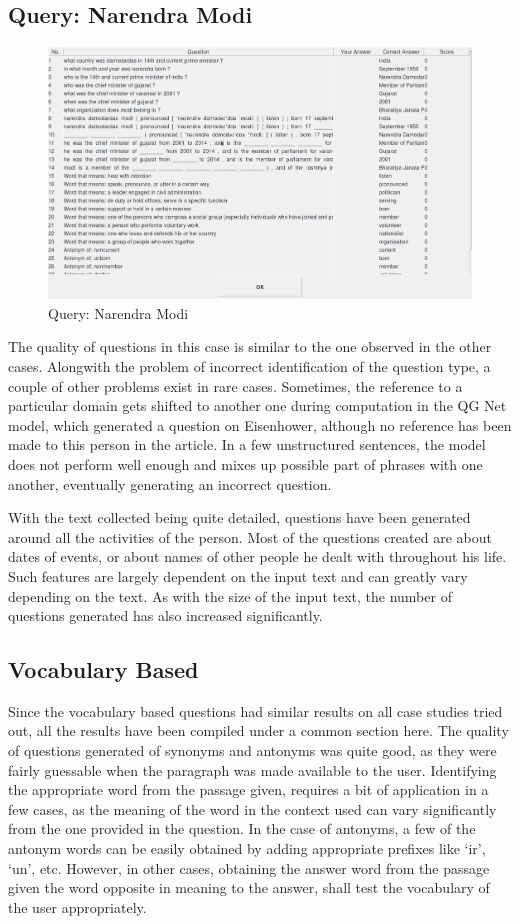 \subsection{Query: Narendra Modi}

\begin{figure}
	\caption{Query: Narendra Modi}
	\centering\includegraphics[width=12cm]{11.png}
\end{figure}

The quality of questions in this case is similar to the one observed in the
other cases. Alongwith the problem of incorrect identification of the question
type, a couple of other problems exist in rare cases.  Sometimes, the reference
to a particular domain gets shifted to another one during computation in the QG
Net model, which generated a question on Eisenhower, although no reference has
been made to this person in the article. In a few unstructured sentences, the
model does not perform well enough and mixes up possible part of phrases with
one another, eventually generating an incorrect question.

With the text collected being quite detailed, questions have been generated
around all the activities of the person. Most of the questions created are about
dates of events, or about names of other people he dealt with throughout his
life. Such features are largely dependent on the input text and can greatly vary
depending on the text. As with the size of the input text, the number of
questions generated has also increased significantly.

\subsection{Vocabulary Based}

Since the vocabulary based questions had similar results on all case studies
tried out, all the results have been compiled under a common section here. The
quality of questions generated of synonyms and antonyms was quite good, as they
were fairly guessable when the paragraph was made available to the user.
Identifying the appropriate word from the passage given, requires a bit of
application in a few cases, as the meaning of the word in the context used can
vary significantly from the one provided in the question. In the case of
antonyms, a few of the antonym words can be easily obtained by adding
appropriate prefixes like ‘ir’, ‘un’, etc. However, in other cases, obtaining
the answer word from the passage given the word opposite in meaning to the
answer, shall test the vocabulary of the user appropriately.

